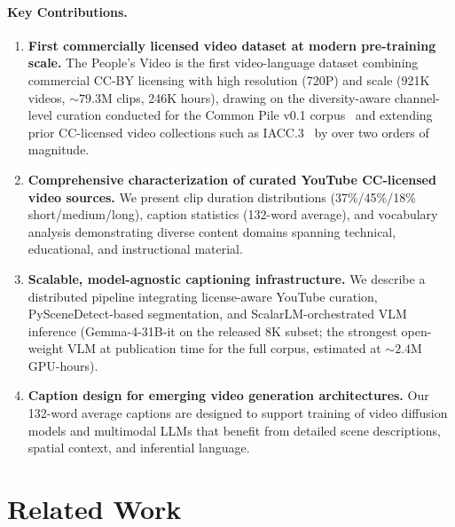 \documentclass{article}
\begin{document}
\paragraph{Key Contributions.}
\begin{enumerate}
    \item \textbf{First commercially licensed video dataset at modern pre-training scale.} The People's Video is the first video-language dataset combining commercial CC-BY licensing with high resolution (720P) and scale (921K videos, ${\sim}79.3$M clips, 246K hours), drawing on the diversity-aware channel-level curation conducted for the Common Pile v0.1 corpus~\cite{kandpal2025commonpile} and extending prior CC-licensed video collections such as IACC.3~\cite{awad2022iacc3} by over two orders of magnitude.

    \item \textbf{Comprehensive characterization of curated YouTube CC-licensed video sources.} We present clip duration distributions (37\%/45\%/18\% short/medium/long), caption statistics (132-word average), and vocabulary analysis demonstrating diverse content domains spanning technical, educational, and instructional material.

    \item \textbf{Scalable, model-agnostic captioning infrastructure.} We describe a distributed pipeline integrating license-aware YouTube curation, PySceneDetect-based segmentation, and ScalarLM-orchestrated VLM inference (Gemma-4-31B-it on the released 8K subset; the strongest open-weight VLM at publication time for the full corpus, estimated at ${\sim}2.4$M GPU-hours).

    \item \textbf{Caption design for emerging video generation architectures.} Our 132-word average captions are designed to support training of video diffusion models and multimodal LLMs that benefit from detailed scene descriptions, spatial context, and inferential language.
\end{enumerate}

\section{Related Work}
\label{sec:related}
\end{document}
